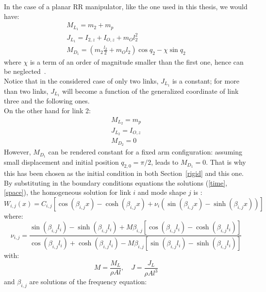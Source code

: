 \documentclass[a4paper,12pt,oneside]{report}
\begin{document}
In the case of a planar RR manipulator, like the one used in this thesis, we would have:
\begin{equation}
  \begin{array}{l}
    M_{L_1}=m_2+m_p\\
    J_{L_1}=I_{2,z}+I_{O,z}+m_Ol_2^2\\
    M_{D_1}=(m_2\frac{l_2}{2}+m_Ol_2)\cos{q_2}-\chi\sin{q_2}
  \end{array}
\end{equation}
where $\chi$ is a term of an order of magnitude smaller than the first one, hence can be neglected~\cite{eighteen}.\\
Notice that in the considered case of only two links, $J_{L_1}$ is a constant; for more than two links, $J_{L_1}$ will become a function of the generalized coordinate of link three and the following ones.\\
On the other hand for link 2:
\begin{equation}
  \begin{array}{l}
    M_{L_2}=m_p\\
    J_{L_2}=I_{O,z}\\
    M_{D_2}=0
  \end{array}
\end{equation}
However, $M_{D_1}$ can be rendered constant for a fixed arm configuration: assuming small displacement and initial position $q_{2,0}=\pi/2$, leads to $M_{D_1}=0$. That is why this has been chosen as the initial condition in both Section~\ref{rigid} and this one.\\
By substituting in the boundary conditions equations the solutions (\ref{time},\ref{space}), the homogeneous solution for link $i$ and mode shape $j$ is \cite{seventeen,eighteen}:
\begin{equation}
  W_{i,j}(x)=C_{i,j}[\cos{(\beta_{i,j} x)}-\cosh{(\beta_{i,j} x)}+\nu_i(\sin{(\beta_{i,j} x)}-\sinh{(\beta_{i,j} x)})]
  \label{lateral_solution}
\end{equation}
where:
\begin{equation}
  \nu_{i,j}=\frac{\sin{(\beta_{i,j}l_i)}-\sinh{(\beta_{i,j}l_i)}+M\beta_{i,j}[\cos{(\beta_{i,j}l_i)}-\cosh{(\beta_{i,j}l_i)}]}{\cos{(\beta_{i,j}l_i)}+\cosh{(\beta_{i,j}l_i)}-M\beta_{i,j}[\sin{(\beta_{i,j}l_i)}-\sinh{(\beta_{i,j}l_i)}]}
\end{equation}
with: 
\begin{equation}
  M=\frac{M_L}{\rho A l}, \quad J=\frac{J_L}{\rho Al^3}
\end{equation}
and $\beta_{i,j}$ are solutions of the frequency equation:
\end{document}
